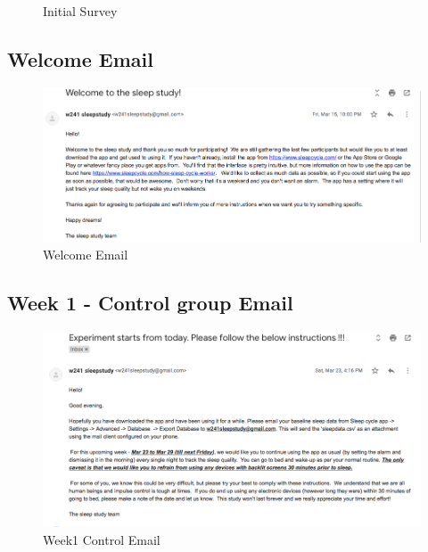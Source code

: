 \documentclass[12pt,]{article}
\begin{document}
\begin{figure}[H]
{}

\caption{Initial Survey}\label{fig:unnamed-chunk-7}
\end{figure}

\subsection{Welcome Email}\label{welcome-email}

\begin{figure}[H]

{\centering \includegraphics[width=1\linewidth]{img/welcome_email} 

}

\caption{Welcome Email}\label{fig:unnamed-chunk-8}
\end{figure}

\subsection{Week 1 - Control group
Email}\label{week-1---control-group-email}

\begin{figure}[H]

{\centering \includegraphics[width=1\linewidth]{img/week1_control} 

}

\caption{Week1 Control Email}\label{fig:unnamed-chunk-9}
\end{figure}
\end{document}
